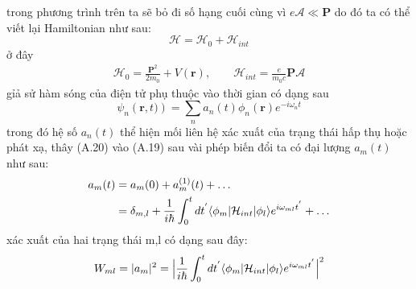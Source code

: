 trong phương trình trên ta sẽ bỏ đi số hạng cuối cùng vì $e\mathcal{A}\ll
\mathbf{P}$ do đó ta có thể viết lại Hamiltonian như sau:
\begin{equation}
\mathcal{H} = \mathcal{H}_0 +\mathcal{H}_{int}
\end{equation}
ở đây
\begin{align*}
\mathcal{H}_0=\frac{\mathbf{P}^2}{2m_0}+ V(\mathbf{r}),\qquad 
\mathcal{H}_{int} = \frac{e}{m_0 c}\mathbf{P}\mathcal{A} 
\end{align*}
gỉả sử hàm sóng của điện tử phụ thuộc vào thời gian có dạng sau
\begin{equation}
\psi_n\left(\mathbf{r},t)\right) = \sum_n a_n(t)\phi_n(\mathbf{r})e^{-i\omega_n t}
\end{equation}
trong đó hệ số $ a_n(t)$ thể hiện mối liên hệ xác xuất của trạng thái hấp thụ hoặc phát xạ, thây (A.20) vào (A.19) sau vài phép biến đổi ta có đại lượng $a_m(t)$ như sau:
\begin{align}
a_m(t) &=a_m(0) + a_m^{(1)}(t) +\dots \notag\\
&=\delta_{m,l} +\frac{1}{i\hbar}\int_0^{t}dt^{'}\langle\phi_m\vert \mathcal{H}_{int}\vert \phi_l\rangle e^{i\omega_{ml}t^{'}} +\dots
\end{align} 
xác xuất của hai trạng thái m,l có dạng sau đây:
\begin{equation}
W_{ml} = \vert a_m \vert^2 = \Bigl\lvert \frac{1}{i\hbar}\int_0^{t}dt^{'}\langle\phi_m\vert \mathcal{H}_{int}\vert \phi_l\rangle e^{i\omega_{ml}t^{'}} \Bigr\rvert^2
\end{equation}